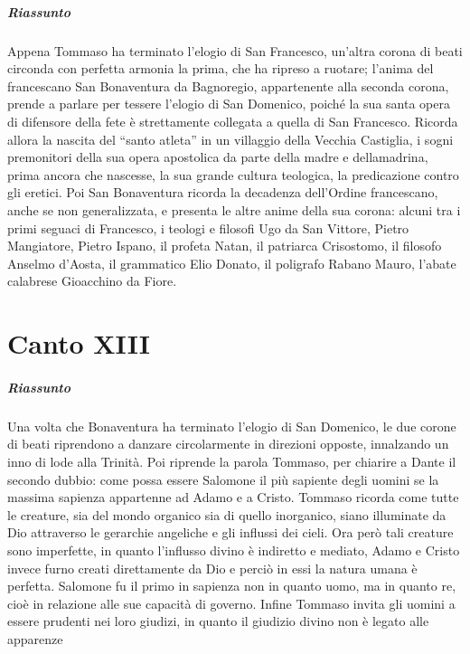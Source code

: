 \documentclass[a4paper, twoside, titlepage]{book}
\begin{document}
\paragraph{Riassunto} Appena Tommaso ha terminato l'elogio di San Francesco, un'altra corona di beati circonda con perfetta armonia la prima, che ha ripreso a ruotare; l'anima del francescano San Bonaventura da Bagnoregio, appartenente alla seconda corona, prende a parlare per tessere l'elogio di San Domenico, poiché la sua santa opera di difensore della fete è strettamente collegata a quella di San Francesco. Ricorda allora la nascita del ``santo atleta'' in un villaggio della Vecchia Castiglia, i sogni premonitori della sua opera apostolica da parte della madre e dellamadrina, prima ancora che nascesse, la sua grande cultura teologica, la predicazione contro gli eretici. Poi San Bonaventura ricorda la decadenza dell'Ordine francescano, anche se non generalizzata, e presenta le altre anime della sua corona: alcuni tra i primi seguaci di Francesco, i teologi e filosofi Ugo da San Vittore, Pietro Mangiatore, Pietro Ispano, il profeta Natan, il patriarca Crisostomo, il filosofo Anselmo d'Aosta, il grammatico Elio Donato, il poligrafo Rabano Mauro, l'abate calabrese Gioacchino da Fiore.

\chapter{Canto XIII}

\paragraph{Riassunto} Una volta che Bonaventura ha terminato l'elogio di San Domenico, le due corone di beati riprendono a danzare circolarmente in direzioni opposte, innalzando un inno di lode alla Trinità. Poi riprende la parola Tommaso, per chiarire a Dante il secondo dubbio: come possa essere Salomone il più sapiente degli uomini se la massima sapienza appartenne ad Adamo e a Cristo. Tommaso ricorda come tutte le creature, sia del mondo organico sia di quello inorganico, siano illuminate da Dio attraverso le gerarchie angeliche e gli influssi dei cieli. Ora però tali creature sono imperfette, in quanto l'influsso divino è indiretto e mediato, Adamo e Cristo invece furno creati direttamente da Dio e perciò in essi la natura umana è perfetta. Salomone fu il primo in sapienza non in quanto uomo, ma in quanto re, cioè in relazione alle sue capacità di governo. Infine Tommaso invita gli uomini a essere prudenti nei loro giudizi, in quanto il giudizio divino non è legato alle apparenze 
\end{document}
